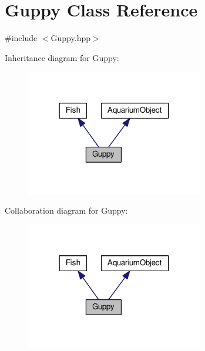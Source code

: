 \hypertarget{class_guppy}{}\section{Guppy Class Reference}
\label{class_guppy}


{\ttfamily \#include $<$Guppy.\+hpp$>$}



Inheritance diagram for Guppy\+:
\nopagebreak
\begin{figure}[H]
\begin{center}
\leavevmode
\includegraphics[width=220pt]{class_guppy__inherit__graph}
\end{center}
\end{figure}


Collaboration diagram for Guppy\+:
\nopagebreak
\begin{figure}[H]
\begin{center}
\leavevmode
\includegraphics[width=220pt]{class_guppy__coll__graph}
\end{center}
\end{figure}
